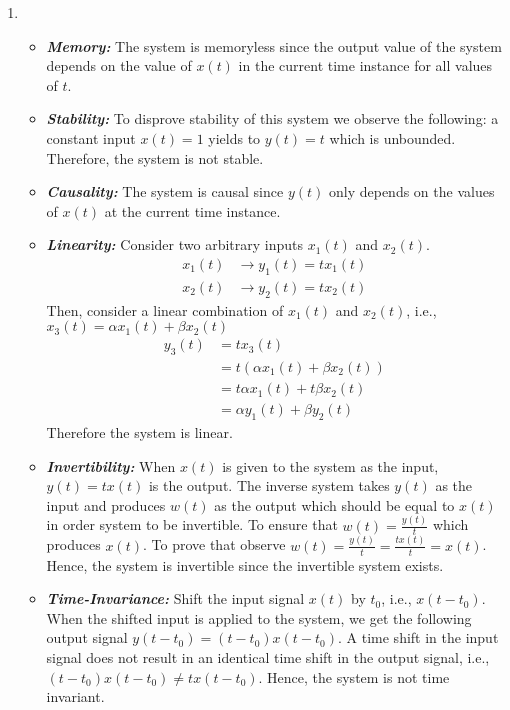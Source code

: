 \documentclass[10pt,a4paper, margin=1in]{article}
\begin{document}
\begin{enumerate}
\begin{enumerate}
    
    \item %
	\begin{itemize}
		\item \textbf{\textit{Memory:}} The system is memoryless since the output value of the system depends on the value of $x(t)$ in the current time instance for all values of $t$.
		\item \textbf{\textit{Stability:}} To disprove stability of this system we observe the following: a constant input $x(t)=1$ yields to $y(t)=t$ which is unbounded. Therefore, the system is not stable.
		\item \textbf{\textit{Causality:}} The system is causal since $y(t)$ only depends on the values of $x(t)$ at the current time instance.
		\item \textbf{\textit{Linearity:}} Consider two arbitrary inputs $x_1(t)$ and $x_2(t)$.
		\begin{equation}
		\begin{split}
			x_1(t) & \rightarrow y_1(t) = t x_1(t)\\
			x_2(t) & \rightarrow y_2(t) = t x_2(t)
		\end{split}
		\end{equation}
		Then, consider a linear combination of $x_1(t)$ and $x_2(t)$, i.e., $x_3(t)=\alpha x_1(t) + \beta x_2(t)$
		\begin{equation}
		\begin{split}
			y_3(t) & = t x_3(t)\\
			& = t (\alpha x_1(t) + \beta x_2(t))\\
			& = t\alpha x_1(t) + t\beta x_2(t)\\
			& = \alpha y_1(t) + \beta y_2(t)
		\end{split}
		\end{equation}
		Therefore the system is linear.
		\item \textbf{\textit{Invertibility:}} When $x(t)$ is given to the system as the input, $y(t) = tx(t)$ is the output. The inverse system takes $y(t)$ as the input and produces $w(t)$ as the output which should be equal to $x(t)$ in order system to be invertible. To ensure that $w(t)=\frac{y(t)}{t}$ which produces $x(t)$. To prove that observe $w(t) = \frac{y(t)}{t} = \frac{tx(t)}{t} = x(t)$. Hence, the system is invertible since the invertible system exists.
		
		
		
		\item \textbf{\textit{Time-Invariance:}} Shift the input signal $x(t)$ by 
		$t_0$, i.e., $x(t-t_0)$. When the shifted input is applied to the system, we get the following output signal $y(t-t_0)  = (t - t_0)x(t - t_0)$. A time shift in the input signal does not result in an identical time shift in the output signal, i.e., $(t - t_0)x(t - t_0) \neq tx(t - t_0)$. Hence, the system is not time invariant.
		

\end{itemize}
\end{enumerate}
\end{enumerate}
\end{document}
